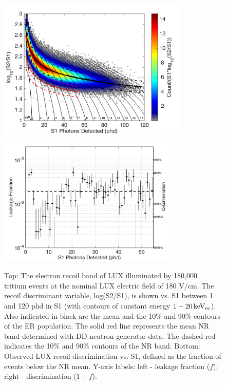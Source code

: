 \begin{figure}[h!]\centering
\includegraphics[width=90mm]{fig/CH3T_ER_Band.png}
\includegraphics[width=85mm]{fig/CH3T_Leakage_Run03.png}
\caption{Top: The electron recoil band of LUX illuminated by 180,000 tritium events at the nominal LUX electric field of 180 V/cm.  The recoil discriminant variable, log(S2/S1), is shown vs. S1 between 1 and 120 phd in S1 (with contours of constant energy $\rm1-20 \, keV_{ee}$). Also indicated in black are the mean and the 10\% and 90\% contours of the ER population. The solid red line represents the mean NR band determined with DD neutron generator data. The dashed red indicates the 10\% and 90\% contours of the NR band. Bottom: Observed LUX recoil discrimination vs. S1, defined as the fraction of events below the NR mean. Y-axis labels: left -  leakage fraction ($f$); right - discrimination ($1-f$).}
\label{fig:ER_band}
\end{figure}





